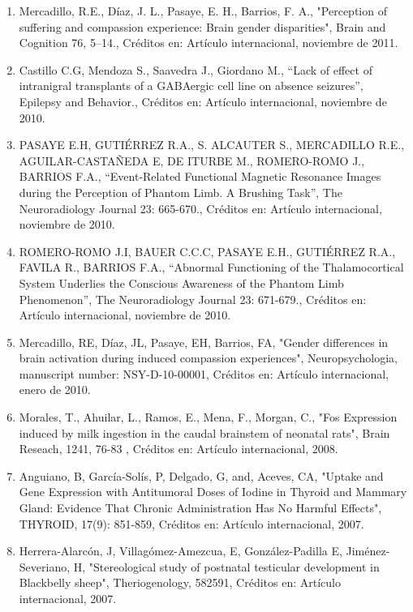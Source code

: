 \documentclass[12pt]{article}
\begin{document}
\begin{enumerate}
\item Mercadillo, R.E., Díaz, J. L., Pasaye, E. H., Barrios, F. A., "Perception of suffering and compassion experience: Brain gender 
disparities", Brain and Cognition 76, 5–14., Créditos en: Artículo internacional, noviembre de 2011.

\item Castillo C.G, Mendoza S., Saavedra J., Giordano M., “Lack of effect of intranigral transplants of a GABAergic cell line on 
absence 
seizures”, Epilepsy and Behavior., Créditos en: Artículo internacional, noviembre de 2010.

\item PASAYE E.H, GUTIÉRREZ R.A., S. ALCAUTER S., MERCADILLO R.E., AGUILAR-CASTAÑEDA E, DE ITURBE M., ROMERO-ROMO J., BARRIOS F.A., 
“Event-Related Functional Magnetic Resonance Images during the Perception of Phantom Limb. A Brushing Task”, The Neuroradiology Journal 
23: 665-670., Créditos en: Artículo internacional, noviembre de 2010.

\item ROMERO-ROMO J.I, BAUER C.C.C, PASAYE E.H., GUTIÉRREZ R.A., FAVILA R., BARRIOS F.A., “Abnormal Functioning of the Thalamocortical 
System Underlies the Conscious Awareness of the Phantom Limb Phenomenon”, The Neuroradiology Journal 23: 671-679., Créditos en: 
Artículo internacional, noviembre de 2010.

\item Mercadillo, RE, Díaz, JL, Pasaye, EH, Barrios, FA, "Gender differences in brain activation during induced compassion 
experiences", 
Neuropsychologia, manuscript number: NSY-D-10-00001, Créditos en: Artículo internacional, enero de 2010.

\item Morales, T., Ahuilar, L., Ramos, E., Mena, F., Morgan, C., "Fos Expression induced by milk ingestion in the caudal brainstem of 
neonatal rats", Brain Reseach, 1241, 76-83 , Créditos en: Artículo internacional, 2008.

\item Anguiano, B, García-Solís, P, Delgado, G, and, Aceves, CA, "Uptake and Gene Expression with Antitumoral Doses of Iodine in 
Thyroid 
and Mammary Gland: Evidence That Chronic Administration Has No Harmful Effects", THYROID, 17(9): 851-859, Créditos en: Artículo 
internacional, 2007.

\item Herrera-Alarcón, J, Villagómez-Amezcua, E, González-Padilla E, Jiménez-Severiano, H, "Stereological study of postnatal testicular 
development in Blackbelly sheep", Theriogenology, 582591, Créditos en: Artículo internacional, 2007.


\end{enumerate}
\end{document}
